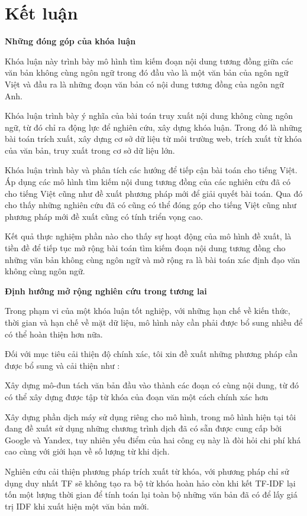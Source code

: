 \documentclass[12pt]{report}
\begin{document}
\chapter{Kết luận}
\label{chap:conclusion}

\textbf{Những đóng góp của khóa luận}

Khóa luận này trình bày mô hình tìm kiếm đoạn nội dung tương đồng giữa các văn bản không cùng ngôn ngữ trong đó đầu vào là một văn bản của ngôn ngữ  Việt  và đầu ra là những đoạn văn bản có nội dung tương đồng của ngôn ngữ Anh.

Khóa luận trình bày ý nghĩa của bài toán truy xuất nội dung không cùng ngôn ngữ, từ đó chỉ ra động lực để nghiên cứu, xây dựng khóa luận. Trong đó là những bài toán trích xuất, xây dựng cơ sở dữ liệu từ môi trường web, trích xuất từ khóa của văn bản, truy xuất trong cơ sở dữ liệu lớn.

Khóa luận trình bày và phân tích các hướng để tiếp cận bài toán cho tiếng Việt. Áp dụng các mô hình tìm kiếm nội dung tương đồng của các nghiên cứu đã có cho tiếng Việt cũng như đề xuất phương pháp mới để giải quyết bài toán. Qua đó cho thấy những nghiên cứu đã có cũng có thể đóng góp cho tiếng Việt cũng như phương pháp mới đề xuất cũng có tính triển vọng cao.

Kết quả thực nghiệm phần nào cho thấy sự hoạt động của mô hình đề xuất, là tiền đề để tiếp tục mở rộng bài toán tìm kiếm đoạn nội dung tương đồng cho những văn bản không cùng ngôn ngữ và mở rộng ra là bài toán xác định đạo văn không cùng ngôn ngữ.


\noindent\textbf{Định hướng mở rộng nghiên cứu trong tương lai}

Trong phạm vi của một khóa luận tốt nghiệp, với những hạn chế về kiến thức, thời gian và hạn chế về mặt dữ liệu, mô hình này cần phải được bổ sung nhiều để có thể hoàn thiện hơn nữa.

Đối với mục tiêu cải thiện độ chính xác, tôi xin đề xuất những phương pháp cần được bổ sung và cải thiện như :

Xây dựng mô-đun tách văn bản đầu vào thành các đoạn có cùng nội dung, từ đó có thể xây dựng được tập từ khóa của đoạn văn một cách chính xác hơn

Xây dựng phần dịch máy sử dụng riêng cho mô hình, trong mô hình hiện tại tôi đang đề xuất sử dụng những chương trình dịch đã có sẵn được cung cấp bởi Google và Yandex, tuy nhiên yếu điểm của hai công cụ này là đòi hỏi chi phí khá cao cùng với giới hạn về số lượng từ khi dịch.

Nghiên cứu cải thiện phương pháp trích xuất từ khóa, với phương pháp chỉ sử dụng duy nhất TF sẽ không tạo ra bộ từ khóa hoàn hảo còn khi kết TF-IDF lại tốn một lượng thời gian để tính toán lại toàn bộ những văn bản đã có để lấy giá trị IDF khi xuất hiện một văn bản mới.
\cleardoublepage
\appendix
\end{document}
